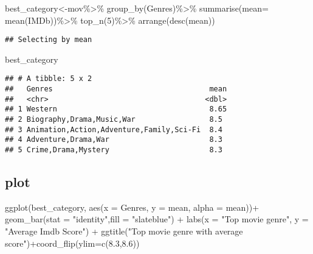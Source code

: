 \documentclass[
]{article}
\newenvironment{Shaded}{\begin{snugshade}}{\end{snugshade}}
\newcommand{\AttributeTok}[1]{\textcolor[rgb]{0.77,0.63,0.00}{#1}}
\newcommand{\DecValTok}[1]{\textcolor[rgb]{0.00,0.00,0.81}{#1}}
\newcommand{\FloatTok}[1]{\textcolor[rgb]{0.00,0.00,0.81}{#1}}
\newcommand{\FunctionTok}[1]{\textcolor[rgb]{0.00,0.00,0.00}{#1}}
\newcommand{\NormalTok}[1]{#1}
\newcommand{\OtherTok}[1]{\textcolor[rgb]{0.56,0.35,0.01}{#1}}
\newcommand{\SpecialCharTok}[1]{\textcolor[rgb]{0.00,0.00,0.00}{#1}}
\newcommand{\StringTok}[1]{\textcolor[rgb]{0.31,0.60,0.02}{#1}}
\begin{document}
\begin{Shaded}
\begin{Highlighting}[]
\NormalTok{best\_category}\OtherTok{\textless{}{-}}\NormalTok{mov}\SpecialCharTok{\%\textgreater{}\%}
  \FunctionTok{group\_by}\NormalTok{(Genres)}\SpecialCharTok{\%\textgreater{}\%}
  \FunctionTok{summarise}\NormalTok{(}\AttributeTok{mean=} \FunctionTok{mean}\NormalTok{(IMDb))}\SpecialCharTok{\%\textgreater{}\%}
  \FunctionTok{top\_n}\NormalTok{(}\DecValTok{5}\NormalTok{)}\SpecialCharTok{\%\textgreater{}\%}
  \FunctionTok{arrange}\NormalTok{(}\FunctionTok{desc}\NormalTok{(mean))}
\end{Highlighting}
\end{Shaded}

\begin{verbatim}
## Selecting by mean
\end{verbatim}

\begin{Shaded}
\begin{Highlighting}[]
\NormalTok{best\_category}
\end{Highlighting}
\end{Shaded}

\begin{verbatim}
## # A tibble: 5 x 2
##   Genres                                    mean
##   <chr>                                    <dbl>
## 1 Western                                   8.65
## 2 Biography,Drama,Music,War                 8.5 
## 3 Animation,Action,Adventure,Family,Sci-Fi  8.4 
## 4 Adventure,Drama,War                       8.3 
## 5 Crime,Drama,Mystery                       8.3
\end{verbatim}

\hypertarget{plot}{%
\subsection{plot}\label{plot}}

\begin{Shaded}
\begin{Highlighting}[]
\FunctionTok{ggplot}\NormalTok{(best\_category, }\FunctionTok{aes}\NormalTok{(}\AttributeTok{x =}\NormalTok{ Genres, }\AttributeTok{y =}\NormalTok{ mean, }\AttributeTok{alpha =}\NormalTok{ mean))}\SpecialCharTok{+}
  \FunctionTok{geom\_bar}\NormalTok{(}\AttributeTok{stat =} \StringTok{"identity"}\NormalTok{,}\AttributeTok{fill =} \StringTok{"slateblue"}\NormalTok{) }\SpecialCharTok{+} \FunctionTok{labs}\NormalTok{(}\AttributeTok{x =} \StringTok{"Top movie genre"}\NormalTok{, }\AttributeTok{y =} \StringTok{"Average Imdb Score"}\NormalTok{) }\SpecialCharTok{+} 
  \FunctionTok{ggtitle}\NormalTok{(}\StringTok{"Top movie genre with average score"}\NormalTok{)}\SpecialCharTok{+}\FunctionTok{coord\_flip}\NormalTok{(}\AttributeTok{ylim=}\FunctionTok{c}\NormalTok{(}\FloatTok{8.3}\NormalTok{,}\FloatTok{8.6}\NormalTok{))}
\end{Highlighting}
\end{Shaded}
\end{document}
